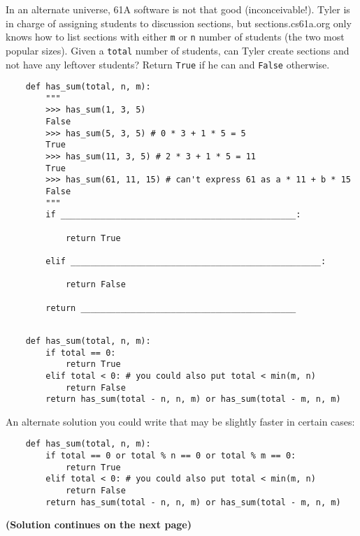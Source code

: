 \begin{blocksection}
    \question In an alternate universe, 61A software is not that good (inconceivable!). 
    Tyler is in charge of assigning students to discussion sections, but sections.cs61a.org 
    only knows how to list sections with either \lstinline{m} or \lstinline{n} number of students (the two most popular sizes). 
    Given a \lstinline{total} number of students, can Tyler create sections and not have any leftover students? 
    Return \lstinline{True} if he can and \lstinline{False} otherwise.
    
    \begin{lstlisting}
    def has_sum(total, n, m):
        """
        >>> has_sum(1, 3, 5)
        False
        >>> has_sum(5, 3, 5) # 0 * 3 + 1 * 5 = 5
        True
        >>> has_sum(11, 3, 5) # 2 * 3 + 1 * 5 = 11
        True
        >>> has_sum(61, 11, 15) # can't express 61 as a * 11 + b * 15
        False
        """
        if _______________________________________________:
    
            return True
    
        elif __________________________________________________:
    
            return False
    
        return ___________________________________________
    
    \end{lstlisting}
    \end{blocksection}
    
    \begin{solution}[1.5in]
    \begin{blocksection}
    \begin{lstlisting}
    def has_sum(total, n, m):
        if total == 0:
            return True
        elif total < 0: # you could also put total < min(m, n)
            return False
        return has_sum(total - n, n, m) or has_sum(total - m, n, m)
    \end{lstlisting}
    An alternate solution you could write that may be slightly faster in certain cases:
    \begin{lstlisting}
    def has_sum(total, n, m):
        if total == 0 or total % n == 0 or total % m == 0:
            return True
        elif total < 0: # you could also put total < min(m, n)
            return False
        return has_sum(total - n, n, m) or has_sum(total - m, n, m)
    \end{lstlisting}
    
    \textbf{(Solution continues on the next page)}
    \end{blocksection}
    \end{solution}
    

